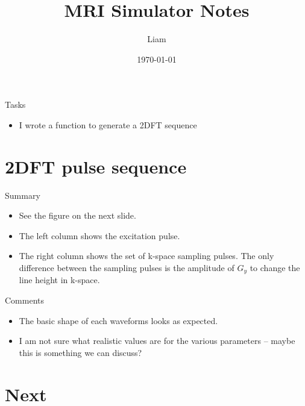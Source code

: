 \documentclass[dvipsnames]{beamer}
\title{MRI Simulator Notes}
\author{Liam}
\date{\today}
\begin{document}
\begin{frame}
\maketitle
\end{frame}

\begin{frame}{Tasks}
\begin{itemize}
\item I wrote a function to generate a 2DFT sequence
\end{itemize}
\end{frame}

\section{2DFT pulse sequence}

\begin{frame}{Summary}
\begin{itemize}
\item See the figure on the next slide.
\item The left column shows the excitation pulse.
\item The right column shows the set of k-space sampling pulses. The only difference between the sampling pulses is the amplitude of $G_y$ to change the line height in k-space.
\end{itemize}
\end{frame}

\begin{frame}{2DFT pulse sequence example}
\begin{center}
\texttt{[image: \{pulse\_sequence\_2dft]}}
\end{center}
\end{frame}

\begin{frame}{Comments}
\begin{itemize}
\item The basic shape of each waveforms looks as expected.
\item I am not sure what realistic values are for the various parameters -- maybe this is something we can discuss?
\end{itemize}
\end{frame}

\section{Next}
\end{document}

